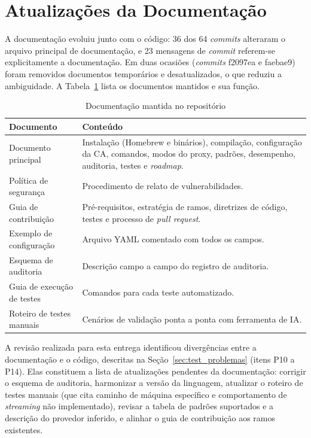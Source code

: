 \section{Atualizações da Documentação}
\label{sec:dev_doc}

A documentação evoluiu junto com o código: 36 dos 64 \textit{commits} alteraram o arquivo principal de documentação, e 23 mensagens de \textit{commit} referem-se explicitamente a documentação. Em duas ocasiões (\textit{commits} f2097ea e faebae9) foram removidos documentos temporários e desatualizados, o que reduziu a ambiguidade. A Tabela~\ref{tab:docs} lista os documentos mantidos e sua função.

\begin{table}[htb]
\centering
\caption{Documentação mantida no repositório}\label{tab:docs}
\small
\begin{tabular}{|p{4.4cm}|p{9.5cm}|}
\hline
\textbf{Documento} & \textbf{Conteúdo} \\ \hline
Documento principal & Instalação (Homebrew e binários), compilação, configuração da CA, comandos, modos do proxy, padrões, desempenho, auditoria, testes e \textit{roadmap}. \\ \hline
Política de segurança & Procedimento de relato de vulnerabilidades. \\ \hline
Guia de contribuição & Pré-requisitos, estratégia de ramos, diretrizes de código, testes e processo de \textit{pull request}. \\ \hline
Exemplo de configuração & Arquivo YAML comentado com todos os campos. \\ \hline
Esquema de auditoria & Descrição campo a campo do registro de auditoria. \\ \hline
Guia de execução de testes & Comandos para cada teste automatizado. \\ \hline
Roteiro de testes manuais & Cenários de validação ponta a ponta com ferramenta de IA. \\ \hline
\end{tabular}
\end{table}

A revisão realizada para esta entrega identificou divergências entre a documentação e o código, descritas na Seção~\ref{sec:test_problemas} (itens P10 a P14). Elas constituem a lista de atualizações pendentes da documentação: corrigir o esquema de auditoria, harmonizar a versão da linguagem, atualizar o roteiro de testes manuais (que cita caminho de máquina específico e comportamento de \textit{streaming} não implementado), revisar a tabela de padrões suportados e a descrição do provedor inferido, e alinhar o guia de contribuição aos ramos existentes.
